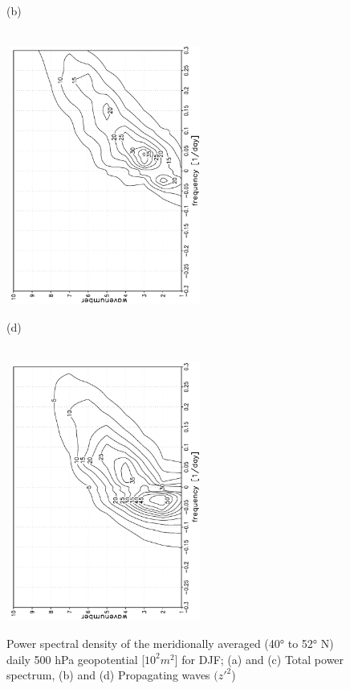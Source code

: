\documentclass[12pt,a4paper,twoside,openright,headinclude,liststotoc,bibtotoc]{scrreprt}
\begin{document}
\begin{figure}[c]
{}
\parbox{8.5cm}{\hspace{0.50cm}\begin{scriptsize}(b)\end{scriptsize} \vspace{-0.3cm} \\
\includegraphics[height=8.5cm,width=6.5cm,angle=-90]
{eps/wave.srv_travellingDJF.eps}
}
\parbox{8.5cm}{\hspace{0.52cm}\begin{scriptsize}(d)\end{scriptsize} \vspace{-0.3cm} \\
\includegraphics[height=8.5cm,width=6.5cm,angle=-90]
{eps/DJFERA_Z500_travelling.eps}
}
\caption[Wavenumber-frequency spectra]{Power spectral density of the meridionally averaged (40° to 52° N) daily 500 hPa geopotential [$10^2 m^2$] for DJF; (a) and (c) Total power spectrum, (b) and (d) Propagating waves $(z'^{2}$)}
\label{img:frepow}
\end{figure}
\end{document}

